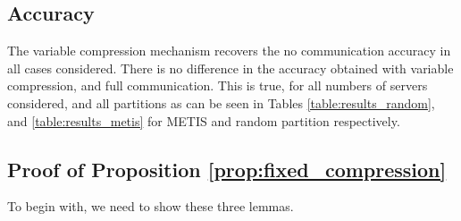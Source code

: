 



\subsection{Accuracy}
The variable compression mechanism recovers the no communication accuracy in all cases considered. There is no difference in the accuracy obtained with variable compression, and full communication. This is true, for all numbers of servers considered, and all partitions as can be seen in Tables \ref{table:results_random}, and \ref{table:results_metis} for METIS and random partition respectively. 






\subsection{Proof of Proposition \ref{prop:fixed_compression}}
\label{appendix:proposition_fixed_compression}
To begin with, we need to show these three lemmas. 

